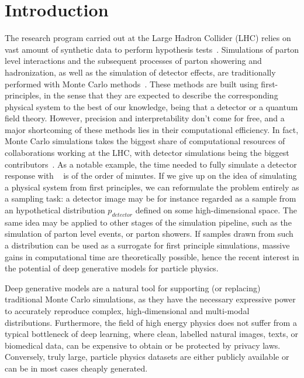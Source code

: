 
\chapter{Introduction}\label{chap:introduction}
\enlargethispage{2ex}
\vspace*{-2pt}

The research program carried out at the Large Hadron Collider (LHC) relies on vast amount of synthetic data to perform hypothesis tests~\cite{Apostolakis:2308666, Aarrestad:2729448, Calafiura:2729668, ATL-SOFT-PUB-2018-002}. Simulations of parton level interactions and the subsequent processes of parton showering and hadronization, as well as the simulation of detector effects, are traditionally performed with Monte Carlo methods~\cite{delphes, madgraph, pythia}. These methods are built using first-principles, in the sense that they are expected to describe the corresponding physical system to the best of our knowledge, being that a detector or a quantum field theory. 
However, precision and interpretability don't come for free, and a major shortcoming of these methods lies in their computational efficiency. In fact, Monte Carlo simulations takes the biggest share of computational resources of collaborations working at the LHC, with detector simulations being the biggest contributors~\cite{Calafiura:2729668}. As a notable example, the time needed to fully simulate a detector response with \geant~\cite{AGOSTINELLI2003250} is of the order of minutes.
If we give up on the idea of simulating a physical system from first principles, we can reformulate the problem entirely as a sampling task: a detector image may be for instance regarded as a sample from an hypothetical distribution $p_{detector}$ defined on some high-dimensional space. The same idea may be applied to other stages of the simulation pipeline, such as the simulation of parton level events, or parton showers.
If samples drawn from such a distribution can be used as a surrogate for first principle simulations, massive gains in computational time are theoretically possible, hence the recent interest in the potential of deep generative models for particle physics\cite{aachen_wgan1, aachen_wgan2, Erdmann:2018kuh, wgan_0, calogan1, calogan2, 2020GANpileup, 2019Lund, DijetGAN1, DijetGAN2, Diefenbacher:2020rna, 2021Getting, ATL-SOFT-PUB-2018-001, 2020iflow1, 2020iflow2, dohi2020variational}. 


Deep generative models are a natural tool for supporting  (or replacing) traditional Monte Carlo simulations, as they have the necessary expressive power to accurately reproduce complex, high-dimensional and multi-modal distributions. Furthermore, the field of high energy physics does not suffer from a typical bottleneck of deep learning, where clean, labelled natural images, texts, or biomedical data, can be expensive to obtain or be protected by privacy laws. Conversely, truly large, particle physics datasets are either publicly available or can be in most cases cheaply generated.

